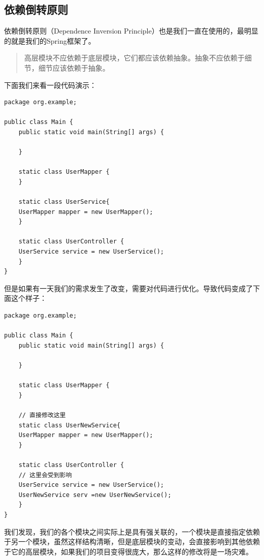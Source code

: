 \documentclass[11pt]{article}
\begin{document}
\subsection{依赖倒转原则}
\label{sec:org26d1288}
依赖倒转原则（Dependence Inversion Principle）也是我们一直在使用的，最明显的就是我们的Spring框架了。
\begin{quote}
高层模块不应依赖于底层模块，它们都应该依赖抽象。抽象不应依赖于细节，细节应该依赖于抽象。
\end{quote}
下面我们来看一段代码演示：
\begin{verbatim}
package org.example;

public class Main {
    public static void main(String[] args) {

    }

    static class UserMapper {
    }

    static class UserService{
	UserMapper mapper = new UserMapper();
    }

    static class UserController {
	UserService service = new UserService();
    }
}
\end{verbatim}
但是如果有一天我们的需求发生了改变，需要对代码进行优化。导致代码变成了下面这个样子：
\begin{verbatim}
package org.example;

public class Main {
    public static void main(String[] args) {

    }

    static class UserMapper {
    }

    // 直接修改这里
    static class UserNewService{
	UserMapper mapper = new UserMapper();
    }

    static class UserController {
	// 这里会受到影响
	UserService service = new UserService();
	UserNewService serv =new UserNewService();
    }
}
\end{verbatim}
我们发现，我们的各个模块之间实际上是具有强关联的，一个模块是直接指定依赖于另一个模块，虽然这样结构清晰，但是底层模块的变动，会直接影响到其他依赖于它的高层模块，如果我们的项目变得很庞大，那么这样的修改将是一场灾难。
\end{document}
